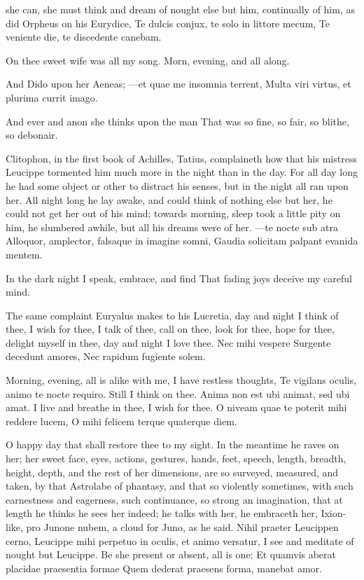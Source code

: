 {she can, she must think and dream of nought else but him, continually
of him, as did Orpheus on his Eurydice,
Te dulcis conjux, te solo in littore mecum,
Te veniente die, te discedente canebam.

On thee sweet wife was all my song.
Morn, evening, and all along.

And Dido upon her Aeneas;
---et quae me insomnia terrent,
Multa viri virtus, et plurima currit imago.

And ever and anon she thinks upon the man
That was so fine, so fair, so blithe, so debonair.

Clitophon, in the first book of Achilles, Tatius, complaineth how that
his mistress Leucippe tormented him much more in the night than in the
day. For all day long he had some object or other to distract his
senses, but in the night all ran upon her. All night long he lay 
awake, and could think of nothing else but her, he could not get her
out of his mind; towards morning, sleep took a little pity on him, he
slumbered awhile, but all his dreams were of her.
---te nocte sub atra
Alloquor, amplector, falsaque in imagine somni,
Gaudia solicitam palpant evanida mentem.

In the dark night I speak, embrace, and find
That fading joys deceive my careful mind.

The same complaint Euryalus makes to his Lucretia, day and night
I think of thee, I wish for thee, I talk of thee, call on thee, look
for thee, hope for thee, delight myself in thee, day and night I love
thee.
Nec mihi vespere
Surgente decedunt amores,
Nec rapidum fugiente solem.

Morning, evening, all is alike with me, I have restless thoughts,
 Te vigilans oculis, animo te nocte requiro. Still I think on
thee. Anima non est ubi animat, sed ubi amat. I live and breathe in
thee, I wish for thee.
O niveam quae te poterit mihi reddere lucem,
O mihi felicem terque quaterque diem.

O happy day that shall restore thee to my sight. In the meantime he
raves on her; her sweet face, eyes, actions, gestures, hands, feet,
speech, length, breadth, height, depth, and the rest of her dimensions,
are so surveyed, measured, and taken, by that Astrolabe of phantasy,
and that so violently sometimes, with such earnestness and eagerness,
such continuance, so strong an imagination, that at length he thinks he
sees her indeed; he talks with her, he embraceth her, Ixion-like, pro
Junone nubem, a cloud for Juno, as he said. Nihil praeter Leucippen
cerno, Leucippe mihi perpetuo in oculis, et animo versatur, I see and
meditate of nought but Leucippe. Be she present or absent, all is one;
Et quamvis aberat placidae praesentia formae
Quem dederat praesens forma, manebat amor.

}
